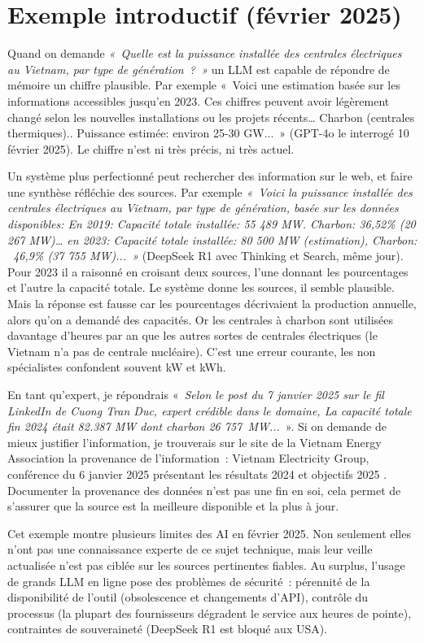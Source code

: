 \documentclass[a4paper,11pt]{report}
\begin{document}
\section{Exemple introductif (février 2025)}

Quand on demande \emph{«~Quelle est la puissance installée des centrales électriques au Vietnam, par type de génération~?~»} un LLM est capable de répondre de mémoire un chiffre plausible. Par exemple «~Voici une estimation basée sur les informations accessibles jusqu'en 2023. Ces chiffres peuvent avoir légèrement changé selon les nouvelles installations ou les projets récents\ldots{} Charbon (centrales thermiques).. Puissance estimée: environ 25-30 GW...~» (GPT-4o le interrogé 10 février 2025). Le chiffre n'est ni très précis, ni très actuel.

Un système plus perfectionné peut rechercher des information sur le web, et faire une synthèse réfléchie des sources. Par exemple \emph{«~Voici la puissance installée des centrales électriques au Vietnam, par type de génération, basée sur les données disponibles: En 2019: Capacité totale installée: 55 489 MW. Charbon: 36,52\% (20 267 MW)\ldots{} en 2023: Capacité totale installée: 80 500 MW (estimation), Charbon: ~46,9\% (37 755 MW)...~»} (DeepSeek R1 avec Thinking et Search, même jour). Pour 2023 il a raisonné en croisant deux sources, l'une donnant les pourcentages et l'autre la capacité totale. Le système donne les sources, il semble plausible. Mais la réponse est fausse car les pourcentages décrivaient la production annuelle, alors qu'on a demandé des capacités. Or les centrales à charbon sont utilisées davantage d'heures par an que les autres sortes de centrales électriques (le Vietnam n'a pas de centrale nucléaire). C'est une erreur courante, les non spécialistes confondent souvent kW et kWh.

En tant qu'expert, je répondrais «~\emph{Selon le post du 7 janvier 2025 sur le fil LinkedIn de Cuong Tran Duc, expert crédible dans le domaine, La capacité totale fin 2024 était 82.387 MW dont charbon 26 757~MW...}~». Si on demande de mieux justifier l'information, je trouverais sur le site de la Vietnam Energy Association la provenance de l'information~: Vietnam Electricity Group, conférence du 6 janvier 2025 présentant les résultats 2024 et objectifs 2025 \citep{DVW38BYR}. Documenter la provenance des données n'est pas une fin en soi, cela permet de s'assurer que la source est la meilleure disponible et la plus à jour.

Cet exemple montre plusieurs limites des AI en février 2025. Non seulement elles n'ont pas une connaissance experte de ce sujet technique, mais leur veille actualisée n'est pas ciblée sur les sources pertinentes fiables. Au surplus, l'usage de grands LLM en ligne pose des problèmes de sécurité~: pérennité de la disponibilité de l'outil (obsolescence et changements d'API), contrôle du processus (la plupart des fournisseurs dégradent le service aux heures de pointe), contraintes de souveraineté (DeepSeek R1 est bloqué aux USA).
\end{document}
